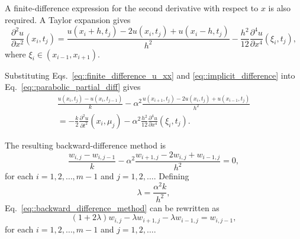 \documentclass[a4paper]{article}
\begin{document}
A finite-difference expression for the second derivative with respect to $x$ is also required. A Taylor expansion gives
\begin{equation}\label{eq::finite_difference_u_xx}
\frac{\partial^2u}{\partial x^2}(x_i,t_j)=\frac{u(x_i+h,t_j)-2u(x_i,t_j)+u(x_i-h,t_j)}{h^2}-\frac{h^2}{12}\frac{\partial^4u}{\partial x^4}(\xi_i,t_j),
\end{equation}
where $\xi_i\in(x_{i-1},x_{i+1})$.

Substituting Eqs.~\ref{eq::finite_difference_u_xx} and \ref{eq::implicit_difference} into Eq.~\ref{eq::parabolic_partial_diff} gives
\begin{equation}
\begin{aligned}
\frac{u(x_i,t_j)-u(x_i,t_{j-1})}{k}-\alpha^2\frac{u(x_{i+1},t_j)-2u(x_i,t_j)+u(x_{i-1},t_j)}{h^2} \\
=-\frac{k}{2}\frac{\partial^2u}{\partial t^2}(x_i,\mu_j)-\alpha^2\frac{h^2}{12}\frac{\partial^4u}{\partial x^4}(\xi_i,t_j).
\end{aligned}
\end{equation}

The resulting backward-difference method is
\begin{equation}\label{eq::backward_difference_method}
\frac{w_{i,j}-w_{i,j-1}}{k}-\alpha^2\frac{w_{i+1,j}-2w_{i,j}+w_{i-1,j}}{h^2}=0,
\end{equation}
for each $i=1,2,\ldots,m-1$ and $j=1,2,\ldots$. Defining
\begin{equation}
\lambda=\frac{\alpha^2k}{h^2},
\end{equation}
Eq.~\ref{eq::backward_difference_method} can be rewritten as
\begin{equation}\label{eq::backward_difference_method_lambda}
(1+2\lambda)w_{i,j}-\lambda w_{i+1,j}-\lambda w_{i-1,j}=w_{i,j-1},
\end{equation}
for each $i=1,2,\ldots,m-1$ and $j=1,2,\ldots$.
\end{document}
